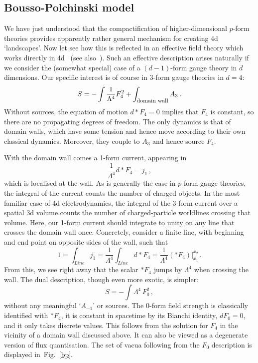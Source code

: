 \documentclass[12pt]{article}
\newcommand{\be}{\begin{equation}}
\newcommand{\ee}{\end{equation}}
\numberwithin{equation}{section}
\begin{document}
\subsection{Bousso-Polchinski model}\label{bpm}
We have just understood that the compactification of higher-dimensional $p$-form theories provides apparently rather general mechanism for creating 4d `landscapes'. Now let 
see how this is reflected in an effective field theory which works directly in 4d~\cite{Bousso:2000xa} (see also~\cite{Feng:2000if}). Such an effective description arises naturally if we consider the (somewhat special) case of a $(d-1)$-form gauge theory in $d$ dimensions. Our specific interest is of course in 3-form gauge theories in $d=4$:
\be
S= -\int \frac{1}{\Lambda^4}F_4^2+\int_{\mbox{\footnotesize domain wall}} A_3\,. \label{sfbp}
\ee
Without sources, the equation of motion $d*F_4=0$ implies that $F_4$ is constant, so there are no propagating degrees of freedom. The only dynamics is that of domain walls, which have some tension and hence move according to their own classical dynamics. Moreover, they couple to $A_3$ and hence source $F_4$. 

With the domain wall comes a 1-form current, appearing in
\be
\frac{1}{\Lambda^4} d*F_4=j_1\,,
\ee
which is localised at the wall. As is generally the case in $p$-form gauge theories, the integral of the current counts the number of charged objects. In the most familiar case of 4d electrodynamics, the integral of the 3-form current over a spatial 3d volume counts the number of charged-particle worldlines crossing that volume. Here, our 1-form current should integrate to unity on any line 
that crosses the domain wall once. Concretely, consider a finite line, with beginning and end point on opposite sides of the wall, such that
\be
1 = \int_{Line} j_1 = \frac{1}{\Lambda^4}\int_{Line} d*F_4 = \frac{1}{\Lambda^4}(*F_4)\Big|_{x_1}^{x_2}\,.
\ee
From this, we see right away that the scalar $*F_4$ jumps by $\Lambda^4$ when crossing the wall. The dual description, though even more exotic, is simpler:
\be
S= -\int \Lambda^4\, F_0^2\,, \label{moft}
\ee
without any meaningful `$A_{-1}$' or sources. The $0$-form field strength is classically identified with $*F_4$, it is constant in spacetime by its Bianchi identity, $dF_0=0$, and it only takes discrete values. This follows from the solution for $F_4$ in the vicinity of a domain wall discussed above. It can also be viewed as a degenerate version of flux quantisation. The set of vacua following from the $F_0$ description is displayed in~Fig.~\ref{bp}. 
\end{document}
